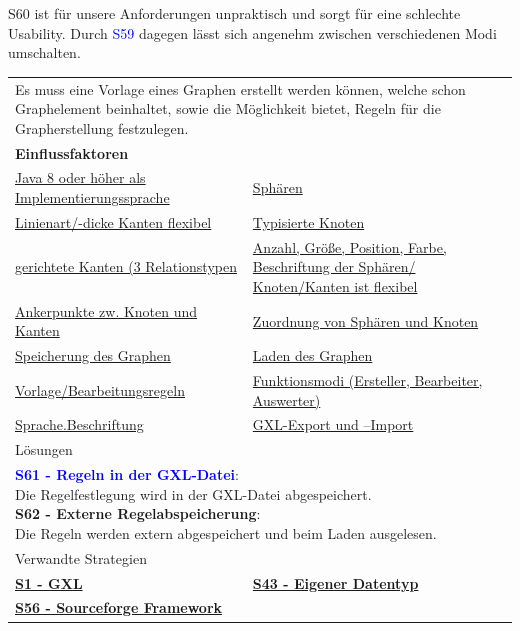 \documentclass[enabledeprecatedfontcommands,fontsize=11pt,paper=a4,twoside]{scrartcl}
\newcounter{one}
\newcommand{\cb}[1]{{\textcolor{blue}{#1}}}
\begin{document}
	\begin{onehalfspace}
		S60 ist für unsere Anforderungen unpraktisch und sorgt für eine schlechte Usability. Durch \cb{S59} dagegen lässt sich angenehm zwischen verschiedenen Modi umschalten. 
	\end{onehalfspace}
	
	\newpage
	\begin{tabular} {|p{8cm} p{8cm}|}
		\hline
		\rowcolor{prob}\multicolumn{2}{|l|}{\parbox{16cm}{\textbf{24: Vorlage}}} \\  \hline\hline 
		\multicolumn{2}{|l|}{\parbox{16cm}{Es muss eine Vorlage eines Graphen erstellt werden können, welche schon Graphelement beinhaltet, sowie die Möglichkeit bietet, Regeln für die Grapherstellung festzulegen.}}\rule{0pt}{4ex}\\ [1ex] \hline
		\multicolumn{2}{|l|}{\textbf{Einflussfaktoren}}\\
		\hyperlink{b}{Java 8 oder höher als Implementierungssprache}  & 
		\hyperlink {n}{Sphären} \\
		\hyperlink {o}{Linienart/-dicke Kanten flexibel}&
		\hyperlink {p}{Typisierte Knoten} \\
		\hyperlink {q}{gerichtete Kanten (3 Relationstypen} &
		\hyperlink {r}{Anzahl, Größe, Position, Farbe, Beschriftung der Sphären/ Knoten/Kanten ist flexibel} \\
		\hyperlink {s}{Ankerpunkte zw. Knoten und Kanten} &
		\hyperlink {t}{Zuordnung von Sphären und Knoten} \\
		\hyperlink {v}{Speicherung des Graphen} &
		\hyperlink {w}{Laden des Graphen} \\
		\hyperlink {y}{Vorlage/Bearbeitungsregeln} &
		\hyperlink {z}{Funktionsmodi (Ersteller, Bearbeiter, Auswerter)} \\
		\hyperlink {hh}{Sprache.Beschriftung} &
		\hyperlink {jj}{GXL-Export und –Import} 
		\\ \hline
		\multicolumn{2}{|l|}{Lösungen} \\
		\multicolumn{2}{|l|}{\parbox{16cm}{
				\textbf{\cb{\hypertarget{vvv}{S61 - Regeln in der GXL-Datei}}}: \\
				Die Regelfestlegung wird in der GXL-Datei abgespeichert. \\
				\textbf{S62 - Externe Regelabspeicherung}: \\
				Die Regeln werden extern abgespeichert und beim Laden ausgelesen. 
		} }\\ [6ex] \hline
		\multicolumn{2}{|l|}{Verwandte Strategien} \\
		\textbf{\hyperlink{yy}{S1 - GXL}}&
		\textbf{\hyperlink{ooo}{S43 - Eigener Datentyp}}\\
		\textbf{\hyperlink{ttt}{S56 - Sourceforge Framework}}&
		\\\hline
	\end{tabular}\\ \\ \\
\end{document}
